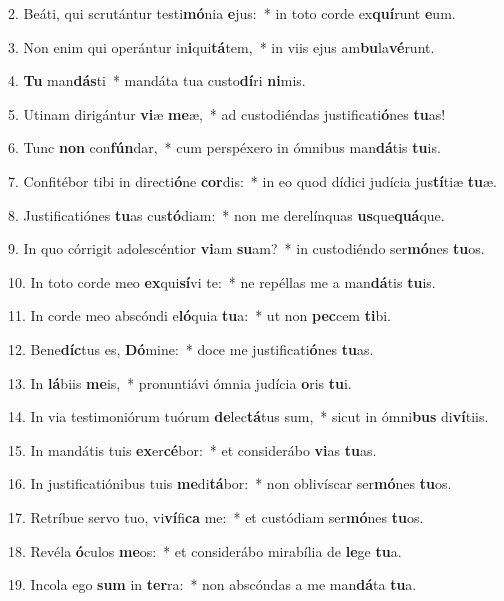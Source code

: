2. Beáti, qui scrutántur testi\textbf{mó}nia \textbf{e}jus:~*  in toto corde ex\textbf{quí}runt \textbf{e}um.\

3. Non enim qui operántur in\textbf{i}qui\textbf{tá}tem,~*  in viis ejus am\textbf{bu}la\textbf{vé}runt.\

4. \textbf{Tu} man\textbf{dás}ti~*  mandáta tua custo\textbf{dí}ri \textbf{ni}mis.\

5. Utinam dirigántur \textbf{vi}æ \textbf{me}æ,~*  ad custodiéndas justificati\textbf{ó}nes \textbf{tu}as!\

6. Tunc \textbf{non} con\textbf{fún}dar,~*  cum perspéxero in ómnibus man\textbf{dá}tis \textbf{tu}is.\

7. Confitébor tibi in directi\textbf{ó}ne \textbf{cor}dis:~*  in eo quod dídici judícia jus\textbf{tí}tiæ \textbf{tu}æ.\

8. Justificatiónes \textbf{tu}as cus\textbf{tó}diam:~*  non me derelínquas \textbf{us}que\textbf{quá}que.\

9. In quo córrigit adolescéntior \textbf{vi}am \textbf{su}am?~*  in custodiéndo ser\textbf{mó}nes \textbf{tu}os.\

10. In toto corde meo \textbf{ex}qui\textbf{sí}vi te:~*  ne repéllas me a man\textbf{dá}tis \textbf{tu}is.\

11. In corde meo abscóndi e\textbf{ló}quia \textbf{tu}a:~*  ut non \textbf{pec}cem \textbf{ti}bi.\

12. Bene\textbf{díc}tus es, \textbf{Dó}mine:~*  doce me justificati\textbf{ó}nes \textbf{tu}as.\

13. In \textbf{lá}biis \textbf{me}is,~*  pronuntiávi ómnia judícia \textbf{o}ris \textbf{tu}i.\

14. In via testimoniórum tuórum \textbf{de}lec\textbf{tá}tus sum,~*  sicut in ómni\textbf{bus} di\textbf{ví}tiis.\

15. In mandátis tuis \textbf{ex}er\textbf{cé}bor:~*  et considerábo \textbf{vi}as \textbf{tu}as.\

16. In justificatiónibus tuis \textbf{me}di\textbf{tá}bor:~*  non oblivíscar ser\textbf{mó}nes \textbf{tu}os.\

17. Retríbue servo tuo, vi\textbf{ví}fi\textbf{ca} me:~*  et custódiam ser\textbf{mó}nes \textbf{tu}os.\

18. Revéla \textbf{ó}culos \textbf{me}os:~*  et considerábo mirabília de \textbf{le}ge \textbf{tu}a.\

19. Incola ego \textbf{sum} in \textbf{ter}ra:~*  non abscóndas a me man\textbf{dá}ta \textbf{tu}a.\

